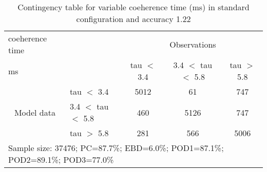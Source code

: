 \begin{table}[]
\begin{center}
\begin{tabular}{llccc}
\hline
{coeherence time}                                       &                                                    & \multicolumn{3}{c}{Observations}                 \\
{ms}                                       &                             & tau $<$ 3.4   & 3.4 $<$ tau $<$ 5.8 & tau $>$ 5.8 \\
\hline
\multicolumn{1}{c}{\multirow{3}{*}{Model data}}  & tau $<$ 3.4             & 5012                & 61                       & 747              \\
                                                 & 3.4  $<$ tau $<$ 5.8 & 460                & 5126                       & 747              \\
                                                 & tau $>$ 5.8             & 281                & 566                       & 5006              \\
\hline
\multicolumn{5}{l}{Sample size: 37476; PC=87.7\%; EBD=6.0\%; POD1=87.1\%; POD2=89.1\%; POD3=77.0\%}
\end{tabular}
\end{center}
\caption{Contingency table for variable coeherence time (ms) in standard configuration and accuracy 1.22}
\label{tab:contingencytauBEF}
\end{table}

